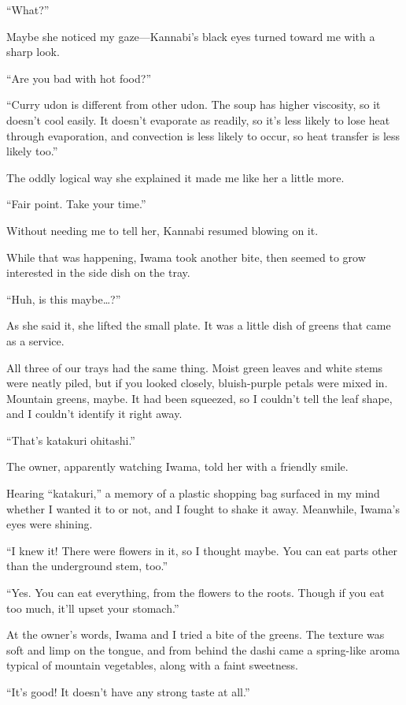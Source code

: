 \documentclass[
    a4paper,
    12pt,
    twoside,
    openany,
    UTF8,
    fontset=windows
]{ctexbook}
\begin{document}
``What?''

Maybe she noticed my gaze---Kannabi's black eyes turned toward me with a sharp look.

``Are you bad with hot food?''

``Curry udon is different from other udon. The soup has higher viscosity, so it doesn't cool easily. It doesn't evaporate as readily, so it's less likely to lose heat through evaporation, and convection is less likely to occur, so heat transfer is less likely too.''

The oddly logical way she explained it made me like her a little more.

``Fair point. Take your time.''

Without needing me to tell her, Kannabi resumed blowing on it.

While that was happening, Iwama took another bite, then seemed to grow interested in the side dish on the tray.

``Huh, is this maybe\dots?''

As she said it, she lifted the small plate. It was a little dish of greens that came as a service.

All three of our trays had the same thing. Moist green leaves and white stems were neatly piled, but if you looked closely, bluish-purple petals were mixed in. Mountain greens, maybe. It had been squeezed, so I couldn't tell the leaf shape, and I couldn't identify it right away.

``That's katakuri ohitashi.''

The owner, apparently watching Iwama, told her with a friendly smile.

Hearing ``katakuri,'' a memory of a plastic shopping bag surfaced in my mind whether I wanted it to or not, and I fought to shake it away. Meanwhile, Iwama's eyes were shining.

``I knew it! There were flowers in it, so I thought maybe. You can eat parts other than the underground stem, too.''

``Yes. You can eat everything, from the flowers to the roots. Though if you eat too much, it'll upset your stomach.''

At the owner's words, Iwama and I tried a bite of the greens. The texture was soft and limp on the tongue, and from behind the dashi came a spring-like aroma typical of mountain vegetables, along with a faint sweetness.

``It's good! It doesn't have any strong taste at all.''
\end{document}
